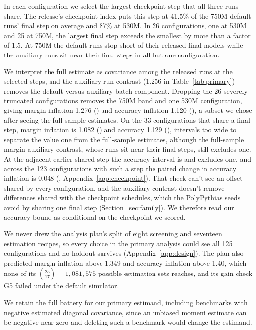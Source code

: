 In each configuration we select the largest checkpoint step that all three runs share. The release's checkpoint index puts this step at 41.5\% of the 750M default runs' final step on average and 87\% at 530M. In 26 configurations, one at 530M and 25 at 750M, the largest final step exceeds the smallest by more than a factor of 1.5. At 750M the default runs stop short of their released final models while the auxiliary runs sit near their final steps in all but one configuration.

We interpret the full estimate as covariance among the released runs at the selected steps, and the auxiliary-run contrast (1.256 in Table~\ref{tab:primary}) removes the default-versus-auxiliary batch component. Dropping the 26 severely truncated configurations removes the 750M band and one 530M configuration, giving margin inflation 1.276 () and accuracy inflation 1.120 (), a subset we chose after seeing the full-sample estimates. On the 33 configurations that share a final step, margin inflation is 1.082 () and accuracy 1.129 (), intervals too wide to separate the value one from the full-sample estimates, although the full-sample margin auxiliary contrast, whose runs sit near their final steps, still excludes one. At the adjacent earlier shared step the accuracy interval is  and excludes one, and across the 123 configurations with such a step the paired change in accuracy inflation is 0.048 (, Appendix~\ref{app:checkpoint}). That check can't see an offset shared by every configuration, and the auxiliary contrast doesn't remove differences shared with the checkpoint schedules, which the PolyPythias seeds avoid by sharing one final step (Section~\ref{sec:family}). We therefore read our accuracy bound as conditional on the checkpoint we scored.

We never drew the analysis plan's split of eight screening and seventeen estimation recipes, so every choice in the primary analysis could see all 125 configurations and no holdout survives (Appendix~\ref{app:design}). The plan also predicted margin inflation above 1.349 and accuracy inflation above 1.40, which none of its $\binom{25}{17}=1{,}081{,}575$ possible estimation sets reaches, and its gain check G5 failed under the default simulator.

We retain the full battery for our primary estimand, including benchmarks with negative estimated diagonal covariance, since an unbiased moment estimate can be negative near zero and deleting such a benchmark would change the estimand.

